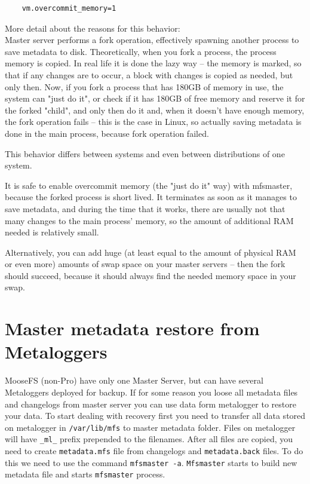 \documentclass[a4paper,11pt,english]{report}
\def\code#1{\texttt{#1}}
\begin{document}
		\begin{lstlisting}
	vm.overcommit_memory=1
		\end{lstlisting}

		More detail about the reasons for this behavior:\\
		Master server performs a fork operation, effectively spawning another process to save metadata to disk. Theoretically, when you fork a process, the process memory is copied. In real life it is done the lazy way -- the memory is marked, so that if any changes are to occur, a block with changes is copied as needed, but only then. Now, if you fork a process that has 180GB of memory in use, the system can "just do it", or check if it has 180GB of free memory and reserve it for the forked "child", and only then do it and, when it doesn't have enough memory, the fork operation fails -- this is the case in Linux, so actually saving metadata is done in the main process, because fork operation failed.

		This behavior differs between systems and even between distributions of one system.

		It is safe to enable overcommit memory (the "just do it" way) with mfsmaster, because the forked process is short lived. It terminates as soon as it manages to save metadata, and during the time that it works, there are usually not that many changes to the main process' memory, so the amount of additional RAM needed is relatively small.

		Alternatively, you can add huge (at least equal to the amount of physical RAM or even more) amounts of swap space on your master servers -- then the fork should succeed, because it should always find the needed memory space in your swap.
		
		\section{Master metadata restore from Metaloggers}
		MooseFS (non-Pro) have only one Master Server, but can have several Metaloggers deployed for backup. If for some reason you loose all metadata files and changelogs from master server you can use data form metalogger to restore your data. To start dealing with recovery first you need to transfer all data stored on metalogger in \code{/var/lib/mfs} to master metadata folder. Files on metalogger will have \code{\_ml\_} prefix prepended to the filenames. After all files are copied, you need to create \code{metadata.mfs} file from changelogs and \code{metadata.back} files. To do this we need to use the command \code{mfsmaster -a}. \code{Mfsmaster} starts to build new metadata file and starts \code{mfsmaster} process.
		
\end{document}
